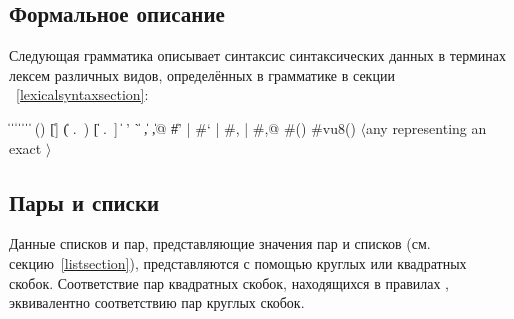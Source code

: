 \subsection{Формальное описание}
\label{datumsyntax}

Следующая грамматика описывает синтаксис синтаксических данных в терминах лексем различных видов,
определённых в грамматике в секции ~\ref{lexicalsyntaxsection}:

\begin{grammar}%
 \: 
\>  \| 
 \:  \| 
\>  \|  \|  \|  
 \: 
 \:  \|  \| 
 \: () \| []
\>    \| ( .\ ) \| [ .\ ]
\>    \| 
 \:  
 \: ' \| ` \| , \| ,@
\>    \| \#' | \#` | \#, | \#,@
 \: \#()
 \: \#vu8()
 \: $\langle${\rm any  representing an exact}
 \>\>\quad{}$\rangle$%
\end{grammar}

\subsection{Пары и списки}
\label{pairlistsyntax}

Данные списков и пар, представляющие значения пар и списков (см. секцию~\ref{listsection}),
представляются с помощью круглых или квадратных скобок. Соответствие пар квадратных скобок,
находящихся в правилах , эквивалентно соответствию пар круглых
скобок.

